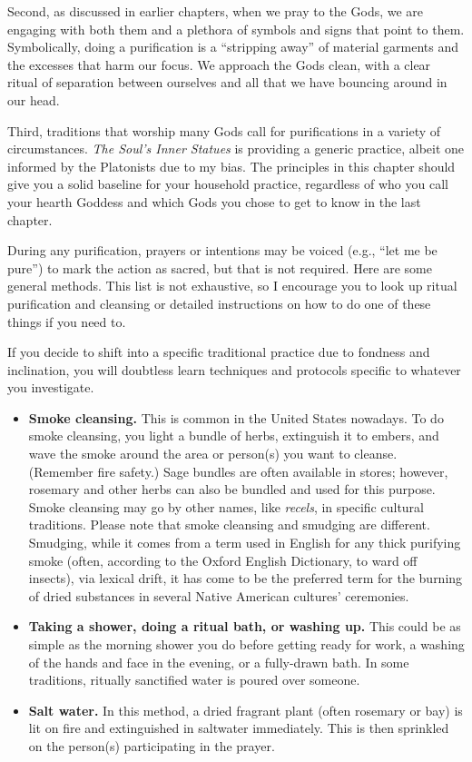 \documentclass[
]{book}
\providecommand{\tightlist}{%
  \setlength{\itemsep}{0pt}\setlength{\parskip}{0pt}}
\begin{document}
Second, as discussed in earlier chapters, when we pray to the Gods, we are engaging with both them and a plethora of symbols and signs that point to them. Symbolically, doing a purification is a ``stripping away'' of material garments and the excesses that harm our focus. We approach the Gods clean, with a clear ritual of separation between ourselves and all that we have bouncing around in our head.

Third, traditions that worship many Gods call for purifications in a variety of circumstances. \emph{The Soul's Inner Statues} is providing a generic practice, albeit one informed by the Platonists due to my bias. The principles in this chapter should give you a solid baseline for your household practice, regardless of who you call your hearth Goddess and which Gods you chose to get to know in the last chapter.

During any purification, prayers or intentions may be voiced (e.g., ``let me be pure'') to mark the action as sacred, but that is not required. Here are some general methods. This list is not exhaustive, so I encourage you to look up ritual purification and cleansing or detailed instructions on how to do one of these things if you need to.

If you decide to shift into a specific traditional practice due to fondness and inclination, you will doubtless learn techniques and protocols specific to whatever you investigate.

\begin{itemize}
\tightlist
\item
  \textbf{Smoke cleansing.} This is common in the United States nowadays. To do smoke cleansing, you light a bundle of herbs, extinguish it to embers, and wave the smoke around the area or person(s) you want to cleanse. (Remember fire safety.) Sage bundles are often available in stores; however, rosemary and other herbs can also be bundled and used for this purpose. Smoke cleansing may go by other names, like \emph{recels}, in specific cultural traditions. Please note that smoke cleansing and smudging are different. Smudging, while it comes from a term used in English for any thick purifying smoke (often, according to the Oxford English Dictionary, to ward off insects), via lexical drift, it has come to be the preferred term for the burning of dried substances in several Native American cultures' ceremonies.
\item
  \textbf{Taking a shower, doing a ritual bath, or washing up.} This could be as simple as the morning shower you do before getting ready for work, a washing of the hands and face in the evening, or a fully-drawn bath. In some traditions, ritually sanctified water is poured over someone.
\item
  \textbf{Salt water.} In this method, a dried fragrant plant (often rosemary or bay) is lit on fire and extinguished in saltwater immediately. This is then sprinkled on the person(s) participating in the prayer.
\end{itemize}
\end{document}
